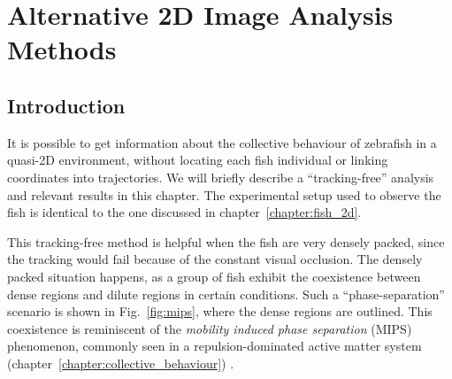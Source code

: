 \documentclass[11pt,twoside]{report}
\begin{document}
\chapter{Alternative 2D Image Analysis Methods}
\label{chapter:extra-2d}


\section{Introduction}

It is possible to get information about the collective behaviour of zebrafish in a quasi-2D environment, without locating each fish individual or linking coordinates into trajectories.
We will briefly describe a ``tracking-free'' analysis and relevant results in this chapter.
The experimental setup used to observe the fish is identical to the one discussed in chapter~\ref{chapter:fish_2d}.

This tracking-free method is helpful when the fish are very densely packed, since the tracking would fail because of the constant visual occlusion.
The densely packed situation happens, as a group of fish exhibit the coexistence between dense regions and dilute regions in certain conditions. Such a ``phase-separation'' scenario is shown in Fig.~\ref{fig:mips}, where the dense regions are outlined.
This coexistence is reminiscent of the \emph{mobility induced phase separation} (\gls{MIPS}) phenomenon, commonly seen in a repulsion-dominated active matter system (chapter~\ref{chapter:collective_behaviour}) \cite{cates2015}.

\end{document}
